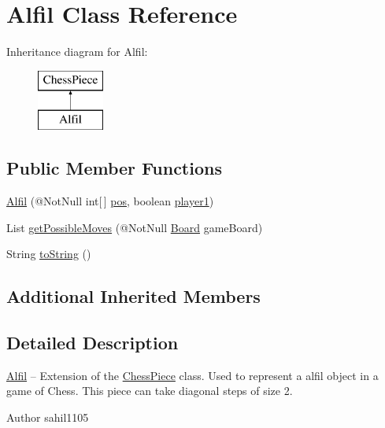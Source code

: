 \hypertarget{class_alfil}{}\section{Alfil Class Reference}
\label{class_alfil}
Inheritance diagram for Alfil\+:\begin{figure}[H]
\begin{center}
\leavevmode
\includegraphics[height=2.000000cm]{class_alfil}
\end{center}
\end{figure}
\subsection*{Public Member Functions}
\begin{DoxyCompactItemize}
\item 
\mbox{\hyperlink{class_alfil_af18a0e0f9b15623984ae32c3945b1be8}{Alfil}} (@Not\+Null int\mbox{[}$\,$\mbox{]} \mbox{\hyperlink{class_chess_piece_ae9f0da2b5fca2557eab359044a7ba1ac}{pos}}, boolean \mbox{\hyperlink{class_chess_piece_aa8711ff5ce8a45159b9b30c8148a34b2}{player1}})
\item 
List \mbox{\hyperlink{class_alfil_a2acff175931d000782b2cc7cb9d3fdca}{get\+Possible\+Moves}} (@Not\+Null \mbox{\hyperlink{class_board}{Board}} game\+Board)
\item 
String \mbox{\hyperlink{class_alfil_a938b5529d7278101329f7d2878c7f3b8}{to\+String}} ()
\end{DoxyCompactItemize}
\subsection*{Additional Inherited Members}


\subsection{Detailed Description}
\mbox{\hyperlink{class_alfil}{Alfil}} -- Extension of the \mbox{\hyperlink{class_chess_piece}{Chess\+Piece}} class. Used to represent a alfil object in a game of Chess. This piece can take diagonal steps of size 2. \begin{DoxyAuthor}{Author}
sahil1105 
\end{DoxyAuthor}


